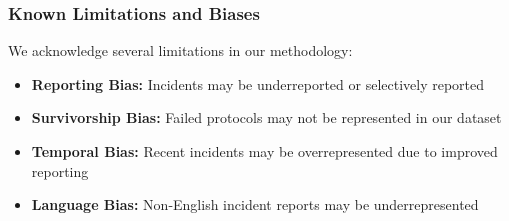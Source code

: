 \subsubsection{Known Limitations and Biases}
We acknowledge several limitations in our methodology:
\begin{itemize}
    \item \textbf{Reporting Bias:} Incidents may be underreported or selectively reported
    \item \textbf{Survivorship Bias:} Failed protocols may not be represented in our dataset
    \item \textbf{Temporal Bias:} Recent incidents may be overrepresented due to improved reporting
    \item \textbf{Language Bias:} Non-English incident reports may be underrepresented
\end{itemize}


